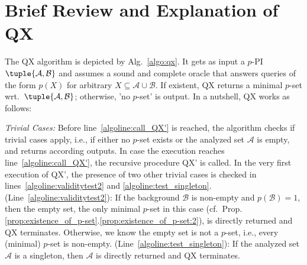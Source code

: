 \documentclass[]{elsarticle}
\newcommand{\scQX}{{\textsc{QX}}}
\newcommand{\ma}{\mathcal{A}}
\newcommand{\mb}{\mathcal{B}}
\begin{document}
	\section{Brief Review and Explanation of \scQX}
	\label{sec:algo}
	The QX algorithm is depicted by Alg.~\ref{algo:qx}. It gets as input a $p$-PI $\tuple{\ma,\mb}$ and assumes a sound and complete oracle that answers queries of the form $p(X)$ for arbitrary $X \subseteq \ma\cup\mb$. If existent, QX returns a minimal $p$-set wrt.\ $\tuple{\ma,\mb}$; otherwise, 'no $p$-set' is output.
	In a nutshell, QX works as follows:\vspace{5pt} 
	
	\noindent \emph{Trivial Cases:} 
	Before line~\ref{algoline:call_QX'} is reached, the algorithm checks if trivial cases apply, i.e., if either no $p$-set exists or the analyzed set $\ma$ is empty, and returns according outputs.
	In case the execution reaches line~\ref{algoline:call_QX'}, the recursive procedure QX' is called. 
	In the very first execution of 
	QX', the presence of two other trivial cases is checked in lines~\ref{algoline:validitytest2} and \ref{algoline:test_singleton}. (Line~\ref{algoline:validitytest2}): If the background $\mb$ is non-empty and $p(\mb)=1$, then the empty set, the only minimal $p$-set in this case (cf.\ Prop.\ref{prop:existence_of_p-set}.\ref{prop:existence_of_p-set:2}), is directly returned and QX terminates. Otherwise, we know the empty set is not a $p$-set, i.e., every (minimal) $p$-set is non-empty. 
	(Line~\ref{algoline:test_singleton}): If the analyzed set $\ma$ is a singleton, then $\ma$ is directly returned and QX terminates. \vspace{0pt}
	
\end{document}
